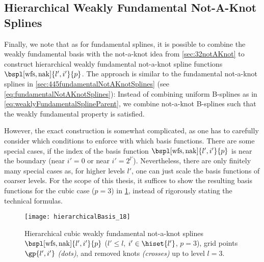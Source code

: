 \subsection{Hierarchical Weakly Fundamental Not-A-Knot Splines}
\label{sec:456wfsNotAKnot}

Finally, we note that as for fundamental splines,
it is possible to combine the weakly fundamental basis
with the not-a-knot idea from \cref{sec:32notAKnot} to construct
hierarchical weakly fundamental not-a-knot spline functions
$\bspl[\wfs,\nak]{l',i'}{p}$.
The approach is similar to the fundamental not-a-knot splines
in \cref{sec:445fundamentalNotAKnotSplines}
(see \cref{eq:fundamentalNotAKnotSplines}):
Instead of combining uniform B-splines as in
\eqref{eq:weaklyFundamentalSplineParent},
we combine not-a-knot B-splines such that the
weakly fundamental property is satisfied.

However, the exact construction is somewhat complicated,
as one has to carefully consider which conditions to enforce
with which basis functions.
There are some special cases, if the index of the basis function
$\bspl[\wfs,\nak]{l',i'}{p}$ is near the boundary
(near $i' = 0$ or near $i' = 2^{l'}$).
Nevertheless, there are only finitely many special cases
as, for higher levels $l'$, one can just scale the basis functions
of coarser levels.
For the scope of this thesis,
it suffices to show the resulting basis functions for
the cubic case ($p = 3$) in
\cref{fig:hierarchicalWeaklyFundamentalNotAKnotSpline},
instead of rigorously stating the technical formulas.

\begin{SCfigure}
  \texttt{[image: hierarchicalBasis\_18]}%
  \caption[%
    Hierarchical weakly fundamental not-a-knot splines%
  ]{%
    Hierarchical cubic weakly fundamental not-a-knot splines
    $\bspl[\wfs,\nak]{l',i'}{p}$
    ($l' \le l$, $i' \in \hiset{l'}$, $p = 3$),
    grid points $\gp{l',i'}$ \emph{(dots)}, and
    removed knots \emph{(crosses)} up to level $l = 3$.%
  }%
  \label{fig:hierarchicalWeaklyFundamentalNotAKnotSpline}%
\end{SCfigure}
